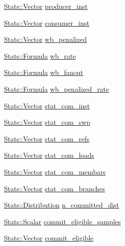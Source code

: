 \begin{DoxyCompactItemize}
\item 
\hyperlink{classStats_1_1Vector}{Stats::Vector} \hyperlink{classBackEnd_a47652a48ae1beac314831c224e026f24}{producer\_\-inst}
\item 
\hyperlink{classStats_1_1Vector}{Stats::Vector} \hyperlink{classBackEnd_a5242b9d95c9537000e64dee2e5ac42cf}{consumer\_\-inst}
\item 
\hyperlink{classStats_1_1Vector}{Stats::Vector} \hyperlink{classBackEnd_adf6ccbeee5b1388f198d050e098df8d5}{wb\_\-penalized}
\item 
\hyperlink{classStats_1_1Formula}{Stats::Formula} \hyperlink{classBackEnd_ae3e32acce8acd38434b6efd36ea6198e}{wb\_\-rate}
\item 
\hyperlink{classStats_1_1Formula}{Stats::Formula} \hyperlink{classBackEnd_ac715c98888746617df195a858e4a13a4}{wb\_\-fanout}
\item 
\hyperlink{classStats_1_1Formula}{Stats::Formula} \hyperlink{classBackEnd_a3f801d7a68c69a6b19ef993fcbad1453}{wb\_\-penalized\_\-rate}
\item 
\hyperlink{classStats_1_1Vector}{Stats::Vector} \hyperlink{classBackEnd_a3f56571c523bf46f2fe976188ad1e50c}{stat\_\-com\_\-inst}
\item 
\hyperlink{classStats_1_1Vector}{Stats::Vector} \hyperlink{classBackEnd_a2c3ec644af0af2970d0066b987427b46}{stat\_\-com\_\-swp}
\item 
\hyperlink{classStats_1_1Vector}{Stats::Vector} \hyperlink{classBackEnd_a541fdbe722e4ddbdcca7994625162235}{stat\_\-com\_\-refs}
\item 
\hyperlink{classStats_1_1Vector}{Stats::Vector} \hyperlink{classBackEnd_a998922e22a0a08c55cf2f5ed99ad79cc}{stat\_\-com\_\-loads}
\item 
\hyperlink{classStats_1_1Vector}{Stats::Vector} \hyperlink{classBackEnd_a2e29921a3b4c4ffb52ceef970898e906}{stat\_\-com\_\-membars}
\item 
\hyperlink{classStats_1_1Vector}{Stats::Vector} \hyperlink{classBackEnd_a3368cb0b59cef9b4542f17661835022f}{stat\_\-com\_\-branches}
\item 
\hyperlink{classStats_1_1Distribution}{Stats::Distribution} \hyperlink{classBackEnd_adef6c140c8c63175c52b3bc6501f9d1c}{n\_\-committed\_\-dist}
\item 
\hyperlink{classStats_1_1Scalar}{Stats::Scalar} \hyperlink{classBackEnd_accdcc276eadba243157fb68d08dd5cda}{commit\_\-eligible\_\-samples}
\item 
\hyperlink{classStats_1_1Vector}{Stats::Vector} \hyperlink{classBackEnd_a3dd8a34217d79ba678222441cf275502}{commit\_\-eligible}

\end{DoxyCompactItemize}
